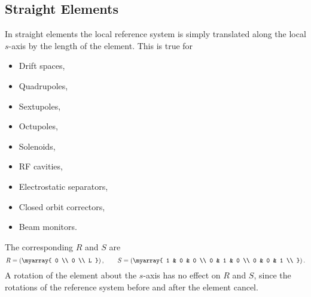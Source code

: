\subsection{Straight Elements}
In straight elements the local reference system is simply
translated along the local \(s\)-axis by the length of the
element.
This is true for
\begin{itemize}
\item Drift spaces,
\item Quadrupoles,
\item Sextupoles,
\item Octupoles,
\item Solenoids,
\item RF cavities,
\item Electrostatic separators,
\item Closed orbit correctors,
\item Beam monitors.
\end{itemize}
The corresponding \(R\) and \(S\) are
\[
   R=\left(\myarray{
      0 \\
      0 \\
      L
   }\right),
   \qquad
   S=\left(\myarray{
      1 & 0 & 0 \\
      0 & 1 & 0 \\
      0 & 0 & 1 \\
   }\right).
\]
A rotation of the element about the \(s\)-axis has no effect
on \(R\) and \(S\),
since the rotations of the reference system before and after the
element cancel.
 
